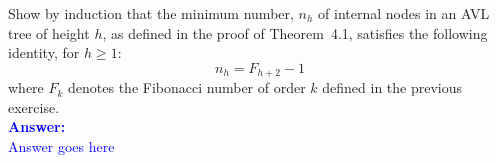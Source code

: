 \item{}
Show by induction that the minimum number, $n_h$ of internal nodes in an AVL
tree of height $h$, as defined in the proof of Theorem~4.1, satisfies the
following identity, for $h\ge1$:
$$n_h=F_{h+2}-1$$
where $F_k$ denotes the Fibonacci number of order $k$ defined in the previous
exercise.\\[12pt]
\ifanswers
\textcolor{blue}{
\textbf{Answer:}\\[6pt]
Answer goes here
}
\newpage
\fi
